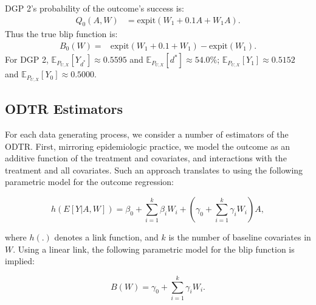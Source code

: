 \documentclass[a4paper,12pt]{article}
\begin{document}
DGP 2's probability of the outcome's success is:
\begin{align*}
Q_0(A,W) &= \textrm{expit}(W_1 + 0.1A + W_1A).
\end{align*}
Thus the true blip function is:
\begin{align*}
    B_0 (W)= & \textrm{expit}(W_1 + 0.1 + W_1) - \textrm{expit}(W_1).
\end{align*}
For DGP 2, $\mathbb{E}_{P_{U,X}} [Y_{d^*} ] \approx 0.5595$ and $\mathbb{E}_{P_{U,X} } [d^* ] \approx 54.0\%$; $\mathbb{E}_{P_{U,X}} [Y_1 ] \approx 0.5152$ and $\mathbb{E}_{P_{U,X}} [Y_0 ] \approx 0.5000$.




\subsection{ODTR Estimators}

For each data generating process, we consider a number of estimators of the ODTR. First, mirroring epidemiologic practice, we model the outcome as an additive function of the treatment and covariates, and interactions with the treatment and all covariates. Such an approach translates to using the following parametric model for the outcome regression:

\[ h(E[Y|A,W]) = \beta_0 + \sum_{i=1}^k \beta_iW_i + \left(\gamma_0 + \sum_{i=1}^k \gamma_iW_i\right)A ,\]

\noindent where $h(.)$ denotes a link function, and $k$ is the number of baseline covariates in $W$. Using a linear link, the following parametric model for the blip function is implied:

\[B (W) = \gamma_0 + \sum_{i=1}^k \gamma_iW_i.\]
\end{document}
